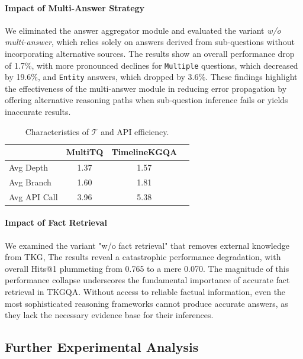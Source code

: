 \documentclass[11pt]{article}
\begin{document}
\paragraph{Impact of Multi-Answer Strategy}

We eliminated the answer aggregator module and evaluated the variant \textit{w/o multi-answer}, which relies solely on answers derived from sub-questions without incorporating alternative sources.
The results show an overall performance drop of 1.7\%, with more pronounced declines for \texttt{Multiple} questions, which decreased by 19.6\%, and \texttt{Entity} answers, which dropped by 3.6\%. These findings highlight the effectiveness of the multi-answer module in reducing error propagation by offering alternative reasoning paths when sub-question inference fails or yields inaccurate results.
\begin{table}[t]
\caption{Characteristics of \(\mathcal{T}\) and API efficiency.}
\label{tab:efficiency}
\centering
\small
\begin{tabular}{lccc}
\toprule
 & \textbf{MultiTQ} & \textbf{TimelineKGQA} \\
\midrule
Avg Depth & 1.37 & 1.57  \\
Avg Branch & 1.60 & 1.81  \\
Avg API Call & 3.96 & 5.38  \\
\bottomrule
\end{tabular}
\vspace{-0.5em}
\end{table}


\paragraph{Impact of Fact Retrieval}

We examined the variant "w/o fact retrieval" that removes external knowledge from TKG, The results reveal a catastrophic performance degradation, with overall Hits@1 plummeting from 0.765 to a mere 0.070.
The magnitude of this performance collapse underscores the fundamental importance of accurate fact retrieval in TKGQA. Without access to reliable factual information, even the most sophisticated reasoning frameworks cannot produce accurate answers, as they lack the necessary evidence base for their inferences.

\subsection{Further Experimental Analysis}
\end{document}
